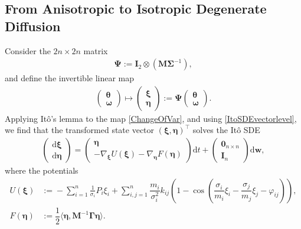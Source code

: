 \documentclass[10pt,twocolumn]{IEEEtran}
\begin{document}
\subsection{From Anisotropic to Isotropic Degenerate Diffusion}\label{subsec:FromAnisoToIso}
Consider the $2n\times 2n$ matrix
\begin{align}
\bm{\Psi}:= \bm{I}_{2} \otimes \left(\bm{M}\bm{\Sigma}^{-1}\right), \label{DefPsi}	
\end{align}
and define the invertible linear map
\begin{align}
\begin{pmatrix}
\bm{\theta}\\
\bm{\omega}	
\end{pmatrix} \mapsto \begin{pmatrix}
\bm{\xi}\\
\bm{\eta}	
\end{pmatrix} := \bm{\Psi} \begin{pmatrix}
\bm{\theta}\\
\bm{\omega}	
\end{pmatrix}. \label{ChangeOfVar}
\end{align}
Applying It\^{o}'s lemma \cite[Ch. 4.2]{oksendal2013stochastic} to the map \eqref{ChangeOfVar}, and using \eqref{ItoSDEvectorlevel}, we find that the transformed state vector $(\bm{\xi},\bm{\eta})^{\top}$ solves the It\^{o} SDE 
\begin{align}
\begin{pmatrix}
{\mathrm{d}}\bm{\xi}\\
{\mathrm{d}}\bm{\eta}	
\end{pmatrix}
\! = \!\begin{pmatrix}
\bm{\eta}\\
-\nabla_{\bm{\xi}}U(\bm{\xi}) -\nabla_{\bm{\eta}}F\left(\bm{\eta}\right)  	
\end{pmatrix}{\mathrm{d}}t + \!\begin{pmatrix}
 \bm{0}_{n\times n}\\
 \bm{I}_{n}	
 \end{pmatrix}{\mathrm{d}}\bm{w},
\label{XiEtaVectorSDE}	
\end{align}
where the potentials
{\small{\begin{subequations}
\begin{align}
U(\bm{\xi}) &:= \!-\displaystyle\sum_{i=1}^{n}\!\frac{1}{\sigma_{i}}P_{i}\xi_{i} + \!\!\displaystyle\sum_{i,j=1}^{n}\!\!\dfrac{m_{i}}{\sigma_{i}^{2}}k_{ij}\!\left(\!1 \!- \!\cos\!\left(\!\dfrac{\sigma_{i}}{m_{i}}\xi_{i} - \dfrac{\sigma_{j}}{m_{j}}\xi_{j} - \varphi_{ij}\!\!\right)\!\right), \label{defU}\\
F(\bm{\eta}) &:= \dfrac{1}{2}\langle\bm{\eta},\bm{M}^{-1}\bm{\Gamma}\bm{\eta}\rangle. \label{defF}	
\end{align}
\label{NewPotentials}	
\end{subequations}}}
\end{document}
